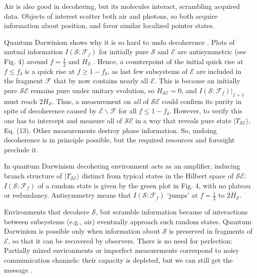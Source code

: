 \documentclass[aps,amsmath,amssymb,amsfonts,12pt]{revtex4-1}
\newcommand{\ket}[1]    {| #1 \rangle}
\newcommand{\cS}        {{\mathcal S}}
\newcommand{\cE}        {{\mathcal E}}
\newcommand{\+}         {\dagger}
\newcommand\cF{{\mathcal F}}
\begin{document}
{{{Air is also good in decohering, but its molecules interact, scrambling acquired data. Objects of interest scatter both air and photons, so both acquire information about position, and favor similar localized pointer states.

Quantum Darwinism shows why it is so hard to undo decoherence \cite{ZwolakZ}. Plots of mutual information $I(\cS : \cF_f)$ for initially pure $\cS$ and $\cE$ are antisymmetric (see Fig. 4) around $f= \frac 1 2$ and $H_\cS$ \cite{8}. Hence, a counterpoint of the initial quick rise at $f \le f_\delta$ is a quick rise at $f \ge 1 - f_\delta$, as last few subsystems of $\cE$ are included in the fragment $\cF$ that by now contains nearly all $\cE$. 
This is because an initially pure $\cS \cE$ remains pure under unitary evolution, so $H_{\cS \cE}=0$, and $I(\cS : \cF_f)|_{f=1}$ must reach $2 H_{\cS}$. Thus, a measurement on {\it all} of $\cS \cE$ could confirm its purity in spite of decoherence caused by $\cE \backslash \cF$ for all $f \le 1- f_\delta$. 
However, to verify this one has to intercept and measure all of $\cS\cE$ in a way that reveals pure state $\ket {\Upsilon_{\cS\cE}}$, Eq. (13). Other measurements destroy phase 
information. So, undoing decoherence is in principle possible, but the required resources and foresight preclude it.

In quantum Darwinism decohering environment acts as an amplifier,
inducing branch structure of $\ket {\Upsilon_{\cS\cE}}$ distinct from typical states in the Hilbert space of $\cS\cE$: $I(\cS : \cF_f)$ of a random state is given by the green plot in Fig. 4, with no plateau or redundancy. 
Antisymmetry means that $I(\cS : \cF_f)$ `jumps' at $f= \frac 1 2$ to $2 H_{\cS}$. 

Environments that decohere $\cS$, but scramble information because of interactions between  subsystems (e.g., air) eventually approach such random states. Quantum Darwinism is possible only when information about $\cS$ is preserved in fragments of $\cE$, so that it can be recovered by observers. There is no need for perfection: Partially mixed environments or imperfect measurements correspond to noisy communication channels: their capacity is depleted, but we can still get the message \cite{ZwolakQZ1, ZwolakQZ2}.


}}}
\end{document}
